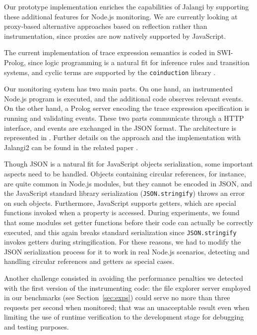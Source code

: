 Our prototype implementation enriches the capabilities of Jalangi by supporting these additional features for Node.js monitoring.
We are currently looking at proxy-based alternative approaches based on reflection rather than instrumentation, since proxies \cite{proxy} are now natively supported by JavaScript.

The current implementation of trace expression semantics is coded in SWI-Prolog, since logic programming is a natural fit for inference rules and transition systems, and cyclic terms are supported by the \texttt{coinduction} library \cite{CoLP06}.

Our monitoring system has two main parts.
On one hand, an instrumented Node.js program is executed, and the additional code observes relevant events.
On the other hand, a Prolog server encoding the trace expression specification is running and validating events.
These two parts communicate through a HTTP interface, and events are exchanged in the JSON format.
The architecture is represented in .
Further details on the approach and the implementation with Jalangi2 can be found in the related paper \cite{TowardsIoT17}.

Though JSON is a natural fit for JavaScript objects serialization, some important aspects need to be handled.
Objects containing circular references, for instance, are quite common in Node.js modules, but they cannot be encoded in JSON, and the JavaScript standard library serialization (\lstinline|JSON.stringify|) throws an error on such objects.
Furthermore, JavaScript supports getters, which are special functions invoked when a property is accessed.
During experiments, we found that some modules set getter functions before their code can actually be correctly executed, and this again breaks standard serialization since \lstinline|JSON.stringify| invokes getters during stringification.
For these reasons, we had to modify the JSON serialization process for it to work in real Node.js scenarios, detecting and handling circular references and getters as special cases.

Another challenge consisted in avoiding the performance penalties we detected with the first version of the
instrumenting code: the file explorer server employed in our benchmarks (see Section~\ref{sec:exps}) could serve no more than
three requests per second when monitored; that was an unacceptable result even when limiting
the use of runtime verification to the development stage for debugging and testing purposes.

